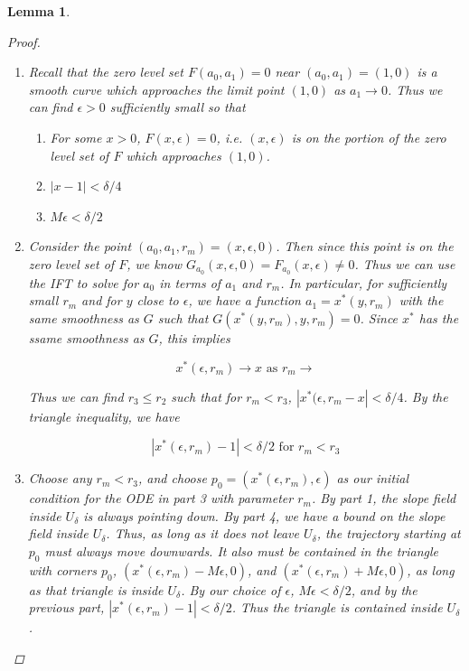 \documentclass[12pt]{article}
\newtheorem{lemma}{Lemma}
\begin{document}
\begin{lemma}
\begin{proof}
\begin{enumerate}
\begin{align*}
\left| \frac{\dot a_0}{\dot a_1} \right|
&\leq \frac{ |G_{a_1}| }{ |G_{a_0}| } \\
&\leq \frac{2\sqrt{1 + \rho^2}}{\rho/2} \\
&= 4 \sqrt{1 + 1/\rho^2}
\end{align*}

Let $M = 4 \sqrt{1 + 1/\rho^2}$. Then $M$ gives us a bound on the (reciprocal of the) slope of the vector field inside $U_\delta$.

\item Recall that the zero level set $F(a_0, a_1) = 0$ near $(a_0, a_1) = (1, 0)$ is a smooth curve which approaches the limit point $(1, 0)$ as $a_1 \rightarrow 0$. Thus we can find $\epsilon > 0$ sufficiently small so that
	\begin{enumerate}
	\item For some $x > 0$, $F(x, \epsilon) = 0$, i.e. $(x, \epsilon)$ is on the portion of the zero level set of $F$ which approaches $(1, 0)$.
	\item $|x - 1| < \delta / 4$
	\item $M \epsilon < \delta / 2$ 
	\end{enumerate}

\item Consider the point $(a_0, a_1,r_m) = (x, \epsilon, 0)$. Then since this point is on the zero level set of $F$, we know $G_{a_0}(x, \epsilon, 0) = F_{a_0}(x, \epsilon) \neq 0$. Thus we can use the IFT to solve for $a_0$ in terms of $a_1$ and $r_m$. In particular, for sufficiently small $r_m$ and for $y$ close to $\epsilon$, we have a function $a_1 = x^*(y, r_m)$ with the same smoothness as $G$ such that $G(x^*(y, r_m), y, r_m) = 0$. Since $x^*$ has the ssame smoothness as $G$, this implies

\[
x^*(\epsilon, r_m) \rightarrow x \text{ as } r_m \rightarrow
\]

Thus we can find $r_3 \leq r_2$ such that for $r_m < r_3$, $|x^*(\epsilon, r_m - x| < \delta / 4$. By the triangle inequality, we have

\[
|x^*(\epsilon, r_m) - 1 | < \delta/2  \text{ for } r_m < r_3
\]

\item Choose any $r_m < r_3$, and choose $p_0 = (x^*(\epsilon, r_m), \epsilon)$ as our initial condition for the ODE in part 3 with parameter $r_m$. By part 1, the slope field inside $U_\delta$ is always pointing down. By part 4, we have a bound on the slope field inside $U_\delta$. Thus, as long as it does not leave $U_\delta$, the trajectory starting at $p_0$ must always move downwards. It also must be contained in the triangle with corners $p_0$, $(x^*(\epsilon, r_m) - M \epsilon, 0)$, and $(x^*(\epsilon, r_m) + M \epsilon, 0)$, as long as that triangle is inside $U_\delta$. By our choice of $\epsilon$, $M \epsilon < \delta / 2$, and by the previous part, $|x^*(\epsilon, r_m) - 1 | < \delta/2$. Thus the triangle is contained inside $U_\delta$. 


\end{enumerate}
\end{proof}
\end{lemma}
\end{document}
